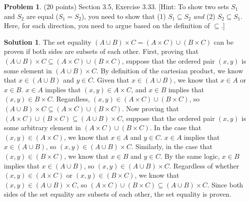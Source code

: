 \documentclass{article}
\theoremstyle{definition}
\newtheorem{problem}{Problem}
\newtheorem*{solution}{Solution}
\begin{document}
\newpage
\begin{problem} (20 points) Section 3.5, Exercise 3.33.
[Hint: To show two sets $S_1$ and $S_2$ are equal ($S_1 = S_2$), you need to 
show that (1) $S_1\subseteq S_2$ \textit{and} (2) $S_2\subseteq S_1$. Here, for each
direction, you need to argue based on the definition of $\subseteq$.] 
\end{problem}
\begin{solution} 
The set equality $(A \cup B) \times C = (A \times C) \cup (B \times C)$ can be proven if both sides are subsets of each other.
First, proving that $(A \cup B) \times C \subseteq (A \times C) \cup (B \times C)$, suppose that the ordered pair $(x, y)$ is some element in $(A \cup B) \times C$.
By definition of the cartesian product, we know that $x \in (A \cup B)$ and $y \in C$.
Given that $x \in (A \cup B)$, we know that $x \in A$ or $x \in B$.
$x \in A$ implies that $(x, y) \in A \times C$, and $x \in B$ implies that $(x, y) \in B \times C$.
Regardless, $(x, y) \in (A \times C) \cup (B \times C)$, so $(A \cup B) \times C \subseteq (A \times C) \cup (B \times C)$.
Now proving that $(A \times C) \cup (B \times C) \subseteq (A \cup B) \times C$, suppose that the ordered pair $(x, y)$ is some arbitrary element in $(A \times C) \cup (B \times C)$.
In the case that $(x, y) \in (A \times C)$, we know that $x \in A$ and $y \in C$.
$x \in A$ implies that $x \in (A \cup B)$, so $(x, y) \in (A \cup B) \times C$.
Similarly, in the case that $(x, y) \in (B \times C)$, we know that $x \in B$ and $y \in C$.
By the same logic, $x \in B$ implies that $x \in (A \cup B)$, so $(x, y) \in (A \cup B) \times C$.
Regardless of whether $(x, y) \in (A \times C)$ or $(x, y) \in (B \times C)$, we know that $(x, y) \in (A \cup B) \times C$, so $(A \times C) \cup (B \times C) \subseteq (A \cup B) \times C$.
Since both sides of the set equality are subsets of each other, the set equality is proven.
\end{solution}
\end{document}
